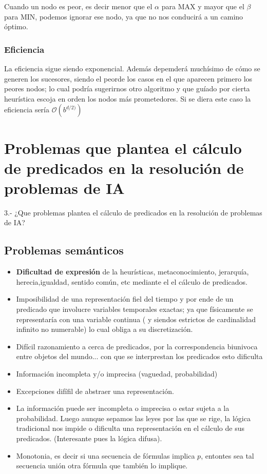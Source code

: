 \documentclass[12 pt, a4paper]{article}
\begin{document}
Cuando un nodo es peor, es decir menor que el $\alpha$ para MAX y mayor que el $\beta$ para MIN, podemos ignorar ese nodo, 
ya que no nos conducirá a un camino óptimo. 

\subsubsection*{Eficiencia}

La eficiencia sigue siendo exponencial. Además depemderá muchísimo de cómo se generen los sucesores, siendo el peorde los
casos en el que aparecen primero los peores nodos; lo cual podría sugerirnos otro algoritmo y que guíado por cierta heurística escoja
en orden los nodos más prometedores. Si se diera este caso la eficiencia sería $\mathcal{O}(b^{d/2)})$ 



\newpage

\section{Problemas que plantea el cálculo de predicados en la resolución de problemas de IA}
3.- ¿Que problemas plantea el cálculo de predicados en la resolución de problemas de IA?

\subsection*{Problemas semánticos}
\begin{itemize}
  \item \textbf{Dificultad de expresión} de la heurísticas, metaconocimiento, jerarquía, herecia,igualdad, sentido común, etc mediante el 
  el cálculo de predicados. 
  \item Imposibilidad de una representación fiel del tiempo y por ende de un predicado que involucre variables temporales exactas; 
  ya que físicamente se representaría con una variable continua ( y siendos estrictos de cardinalidad infinito no numerable) lo cual obliga
  a su discretización.
  \item Difícil razonamiento a cerca de predicados, por la correspondencia biunivoca entre objetos del mundo... con que se interprestan los predicados esto dificulta 
  \item Información incompleta y/o imprecisa (vaguedad, probabilidad)
  \item Excepciones difífil de abstraer una representación. 
  \item La información puede ser incompleta o imprecisa o estar sujeta a la probabilidad. Luego aunque sepamos las leyes por las que se rige, 
  la lógica tradicional nos impide o dificulta una representación en el cálculo de sus predicados. (Interesante pues la lógica difusa).
  \item Monotonia, es decir si una secuencia de fórmulas implica $p$, entontes sea tal secuencia unión otra fórmula que también lo implique. 
  
\end{itemize}
\end{document}
